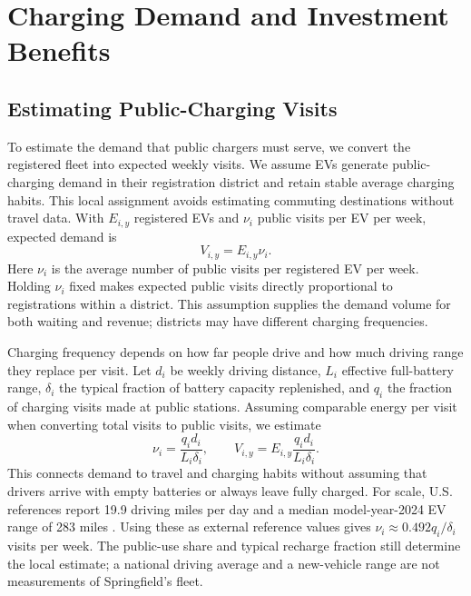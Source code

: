 \documentclass[12pt]{article}
\begin{document}
\section{Charging Demand and Investment Benefits}
\subsection{Estimating Public-Charging Visits}
\label{sec:visits}
To estimate the demand that public chargers must serve, we convert the registered fleet
into expected weekly visits. We assume EVs generate public-charging demand in their
registration district and retain stable average charging habits. This local assignment
avoids estimating commuting destinations without travel data. With $E_{i,y}$ registered
EVs and $\nu_i$ public visits per EV per week, expected demand is
\begin{equation}
V_{i,y}=E_{i,y}\nu_i.\label{eq:visits}
\end{equation}
Here $\nu_i$ is the average number of public visits per registered EV per week. Holding $\nu_i$ fixed makes expected public visits directly proportional to registrations
within a district. This assumption supplies the demand volume for both waiting and
revenue; districts may have different charging frequencies.

Charging frequency depends on how far people drive and how much driving range they
replace per visit. Let $d_i$ be weekly driving distance, $L_i$ effective full-battery
range, $\delta_i$ the typical fraction of battery capacity replenished, and $q_i$ the
fraction of charging visits made at public stations. Assuming comparable energy per
visit when converting total visits to public visits, we estimate
\begin{equation}
\nu_i=\frac{q_i d_i}{L_i\delta_i},\qquad
V_{i,y}=E_{i,y}\frac{q_i d_i}{L_i\delta_i}.\label{eq:frequency}
\end{equation}
This connects demand to travel and charging habits without assuming that drivers
arrive with empty batteries or always leave fully charged. For scale, U.S. references
report 19.9 driving miles per day and a median model-year-2024 EV range of 283 miles
\cite{Driving2024,Range2024}. Using these as external reference values gives
$\nu_i\approx0.492q_i/\delta_i$ visits per week. The public-use share and typical
recharge fraction still determine the local estimate; a national driving average and
a new-vehicle range are not measurements of Springfield's fleet.
\end{document}
